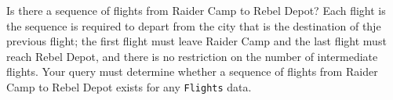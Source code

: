 Is there a sequence of flights from Raider Camp to Rebel Depot?
Each flight is the sequence is required to depart from the city that is the
destination
of thje previous flight;
the first flight must leave Raider Camp
and the last flight must reach Rebel Depot, and there is no
restriction on the number of intermediate flights.
Your query must determine whether a sequence of flights from Raider Camp to Rebel
Depot
exists for any \texttt{Flights} data.
